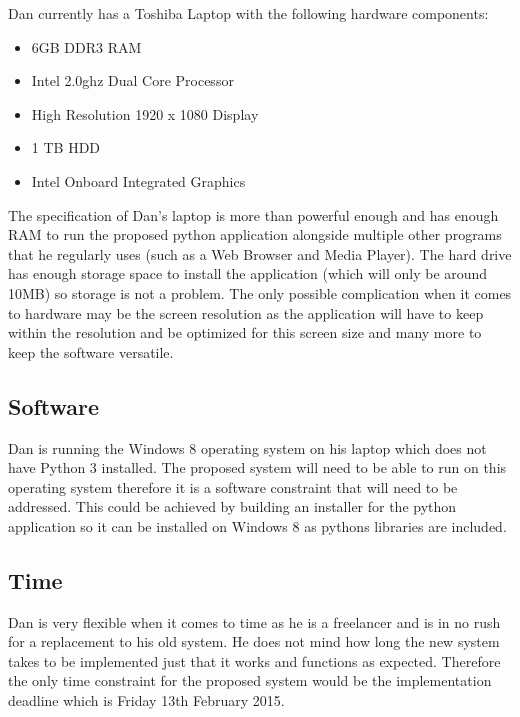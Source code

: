 \begin{flushleft}
	Dan currently has a Toshiba Laptop with the following hardware components:
	
	\begin{itemize}
		\item 6GB DDR3 RAM
		\item Intel 2.0ghz Dual Core Processor
		\item High Resolution 1920 x 1080 Display
		\item 1 TB HDD
		\item Intel Onboard Integrated Graphics
	\end{itemize}

	The specification of Dan's laptop is more than powerful enough and has enough RAM to run the proposed python application alongside multiple other programs that he regularly uses (such as a Web Browser and Media Player). The hard drive has enough storage space to install the application (which will only be around 10MB) so storage is not a problem. The only possible complication when it comes to hardware may be the screen resolution as the application will have to keep within the resolution and be optimized for this screen size and many more to keep the software versatile.
\end{flushleft}

\subsection{Software}

\begin{flushleft}
	Dan is running the Windows 8 operating system on his laptop which does not have Python 3 installed. The proposed system will need to be able to run on this operating system therefore it is a software constraint that will need to be addressed. This could be achieved by building an installer for the python application so it can be installed on Windows 8 as pythons libraries are included.

\end{flushleft}

\subsection{Time}

\begin{flushleft}
 	Dan is very flexible when it comes to time as he is a freelancer and is in no rush for a replacement to his old system. He does not mind how long the new system takes to be implemented just that it works and functions as expected. Therefore the only time constraint for the proposed system would be the implementation deadline which is Friday 13th February 2015.
\end{flushleft}

